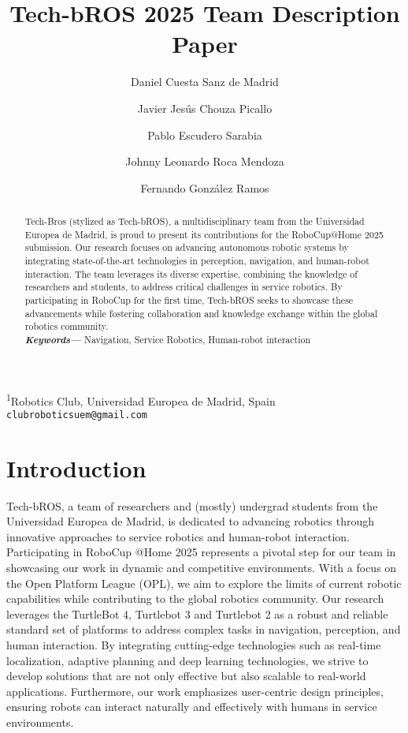 \documentclass[runningheads,a4paper]{llncs}
\title{\Large\textbf{Tech-bROS 2025 Team Description Paper}}
\author{
    Daniel Cuesta Sanz de Madrid\inst{1} \and
    Javier Jesús Chouza Picallo\inst{1} \and
    Pablo Escudero Sarabia\inst{1} \and
    Johnny Leonardo Roca Mendoza\inst{1} \and
    Fernando González Ramos\inst{1}
}
\institute{
    STEAM School, Universidad Europea de Madrid, Spain,\\
    \email{contact@robohome2025.com}\\
    \and
    Robotics Club, Universidad Europea de Madrid, Spain,\\
    \email{clubroboticsuem@gmail.com}
}
\providecommand{\keywords}[1]
{
  \small	
  \textbf{\textit{Keywords---}} #1
}
\begin{document}
\maketitle
{}
\begin{center}
    \textsuperscript{1}Robotics Club, Universidad Europea de Madrid, Spain\\
    \texttt{clubroboticsuem@gmail.com}
\end{center}
%
%

\begin{abstract}
Tech-Bros (stylized as Tech-bROS), a multidisciplinary team from the Universidad Europea de Madrid, is proud to present its contributions for the RoboCup@Home 2025 submission. Our research focuses on advancing autonomous robotic systems by integrating state-of-the-art technologies in perception, navigation, and human-robot interaction. The team leverages its diverse expertise, combining the knowledge of researchers and students, to address critical challenges in service robotics.
\bigbreak
By participating in RoboCup for the first time, Tech-bROS seeks to showcase these advancements while fostering collaboration and knowledge exchange within the global robotics community. \\
\keywords{Navigation, Service Robotics, Human-robot interaction}

 
\end{abstract}




\section{Introduction}

Tech-bROS, a team of researchers and (mostly) undergrad students from the Universidad Europea de Madrid, is dedicated to advancing robotics through innovative approaches to service robotics and human-robot interaction. Participating in RoboCup @Home 2025\cite{robocupathomeedu} represents a pivotal step for our team in showcasing our work in dynamic and competitive environments. With a focus on the Open Platform League (OPL), we aim to explore the limits of current robotic capabilities while contributing to the global robotics community.
\bigbreak
Our research leverages the TurtleBot 4, Turtlebot 3 and Turtlebot 2 as a robust and reliable standard set of platforms to address complex tasks in navigation, perception, and human interaction. By integrating cutting-edge technologies such as real-time localization, adaptive planning and deep learning technologies, we strive to develop solutions that are not only effective but also scalable to real-world applications. Furthermore, our work emphasizes user-centric design principles, ensuring robots can interact naturally and effectively with humans in service environments.
\end{document}
